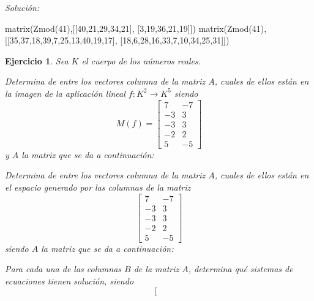 \documentclass[12pt]{amsart}
\newtheorem{ejer}{Ejercicio}
\begin{document}
{\it Soluci\'on:}

\begin{sageblock}
matrix(Zmod(41),[[40,21,29,34,21],
[3,19,36,21,19]])
matrix(Zmod(41),[[35,37,18,39,7,25,13,40,19,17],
[18,6,28,16,33,7,10,34,25,31]])
\end{sageblock}



\begin{ejer} Sea $K$ el cuerpo de los n\'umeros reales.
\newline
\noindent\begin{minipage}{\textwidth}
\begin{tcolorbox}[colback = green!20!white,title=Versión Núcleo]
Determina de entre los vectores columna de la matriz $A$, cuales de ellos están en la imagen de la aplicación lineal $f:K^{2} \to K^{5}$ siendo  $$ M(f) = \left[\begin{array}{rr}
7 & -7 \\
-3 & 3 \\
-3 & 3 \\
-2 & 2 \\
5 & -5
\end{array}\right] $$ y $A$ la matriz que se da a continuación:\end{tcolorbox}
\end{minipage} \newline
\noindent\begin{minipage}{\textwidth}
\begin{tcolorbox}[colback = blue!20!white,title=Versión Anulador]
Determina de entre los vectores columna de la matriz $A$, cuales de ellos están en el espacio generado por las columnas de la matriz $$ \left[\begin{array}{rr}
7 & -7 \\
-3 & 3 \\
-3 & 3 \\
-2 & 2 \\
5 & -5
\end{array}\right] $$ siendo $A$ la matriz que se da a continuación:\end{tcolorbox}
\end{minipage} \newline
\noindent\begin{minipage}{\textwidth} 
\begin{tcolorbox}[colback = red!20!white,title=Versión Ecuaciones Implícitas]
Para cada una de las columnas $B$ de la matriz $A$, determina qué sistemas de ecuaciones tienen solución, siendo $$ \left[\begin{array}{rr}

\end{array}$$
\end{tcolorbox}
\end{minipage}
\end{ejer}
\end{document}
